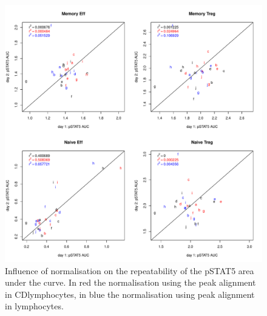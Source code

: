 \begin{figure}[h]
    \centering
    \includegraphics[scale=.5]{IL2/figures/pstat5-auc-repeatability-celltypes.pdf}
    { Influence of normalisation on the repeatability of the pSTAT5 area under the curve. }
    { In red the normalisation using the peak alignment in CD\positive lymphocytes, in blue the normalisation using peak alignment in lymphocytes. }
\end{figure}









